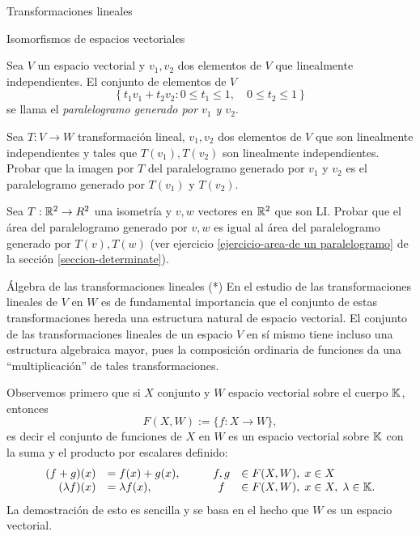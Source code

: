 \begin{chapter}{Transformaciones lineales}
\begin{section}{Isomorfismos de espacios vectoriales}
\begin{enumex}
            \item Sea $V$ un espacio vectorial y $v_1,v_2$  dos elementos de $V$ que linealmente independientes. El conjunto de elementos de $V$ 
            $$
            \left\{ t_1v_1 + t_2v_2: 0 \le t_1 \le 1, \quad 0 \le t_2 \le 1 \right\}
            $$
            se llama el \textit{paralelogramo generado por $v_1$ y $v_2$}. 
            \begin{enumex}
                \item Sea $T: V \to W$ transformación lineal, $v_1,v_2$  dos elementos de $V$ que son linealmente independientes y  tales que $T(v_1),T(v_2)$  son linealmente independientes. Probar que la imagen por $T$ del paralelogramo generado por $v_1$ y $v_2$ es el paralelogramo generado por $T(v_1)$ y $T(v_2)$. 
                \item Sea $T: \mathbb R^2 \to R^2$ una isometría  y $v,w$ vectores en $\mathbb R^2$ que son LI. Probar que el área del paralelogramo generado  por $v,w$ es igual al área del paralelogramo generado por $T(v),T(w)$ (ver ejercicio \ref{ejercicio-area-de un paralelogramo} de la sección \ref{seccion-determinate}).  
            \end{enumex}   
    \end{enumex}

    
        \end{section}
    
        \begin{section}{\'Algebra de las transformaciones lineales (*)}\label{seccion-algebra-de-las-transformaciones-lineales}
            En el estudio de las transformaciones lineales de $V$ en $W$ es de fundamental importancia que el conjunto de estas transformaciones hereda una estructura natural de espacio vectorial. El conjunto de las transformaciones lineales de un espacio $V$ en sí mismo tiene incluso una estructura algebraica mayor, pues la composición ordinaria de funciones da una ``multiplicación'' de tales transformaciones. 
            
            
            Observemos primero que si $X$ conjunto y $W$ espacio vectorial sobre el cuerpo $\mathbb K$,  entonces
            $$
            F(X,W) := \{f:X\to W\},
            $$ 
            es decir el conjunto de funciones de $X$ en $W$ es un espacio vectorial sobre $\mathbb K$ con la suma y el producto por escalares definido:
            \begin{equation*}
            \begin{array}{rlcl}
            (f+g)(x) &= f(x)+ g(x),\qquad &f,g& \in F(X,W),\; x \in X\\
            (\lambda f)(x) &= \lambda f(x), & f& \in F(X,W),\; x \in X, \; \lambda \in \mathbb K.
            \end{array}
            \end{equation*}
            La demostración de esto es sencilla y se basa en el hecho que $W$  es un espacio vectorial. 
            

\end{section}
\end{chapter}
